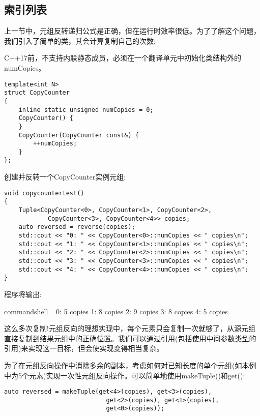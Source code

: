 \subsection{索引列表}

上一节中，元组反转递归公式是正确，但在运行时效率很低。为了了解这个问题，我们引入了简单的类，其会计算复制自己的次数:

\begin{tcolorbox}[colback=webgreen!5!white,colframe=webgreen!75!black]
\hspace*{0.75cm}C++17前，不支持内联静态成员，必须在一个翻译单元中初始化类结构外的numCopies。
\end{tcolorbox}

\begin{lstlisting}[style=styleCXX]
template<int N>
struct CopyCounter
{
	inline static unsigned numCopies = 0;
	CopyCounter() {
	}
	CopyCounter(CopyCounter const&) {
		++numCopies;
	}
};
\end{lstlisting}

创建并反转一个CopyCounter实例元组:

\begin{lstlisting}[style=styleCXX]
void copycountertest()
{
	Tuple<CopyCounter<0>, CopyCounter<1>, CopyCounter<2>,
			CopyCounter<3>, CopyCounter<4>> copies;
	auto reversed = reverse(copies);
	std::cout << "0: " << CopyCounter<0>::numCopies << " copies\n";
	std::cout << "1: " << CopyCounter<1>::numCopies << " copies\n";
	std::cout << "2: " << CopyCounter<2>::numCopies << " copies\n";
	std::cout << "3: " << CopyCounter<3>::numCopies << " copies\n";
	std::cout << "4: " << CopyCounter<4>::numCopies << " copies\n";
}
\end{lstlisting}

程序将输出:

\begin{tcblisting}{commandshell={}}
0: 5 copies
1: 8 copies
2: 9 copies
3: 8 copies
4: 5 copies
\end{tcblisting}

这么多次复制!元组反向的理想实现中，每个元素只会复制一次就够了，从源元组直接复制到结果元组中的正确位置。我们可以通过引用(包括使用中间参数类型的引用)来实现这一目标，但会使实现变得相当复杂。

为了在元组反向操作中消除多余的副本，考虑如何对已知长度的单个元组(如本例中为5个元素)实现一次性元组反向操作。可以简单地使用makeTuple()和get():

\begin{lstlisting}[style=styleCXX]
auto reversed = makeTuple(get<4>(copies), get<3>(copies),
							get<2>(copies), get<1>(copies),
							get<0>(copies));
\end{lstlisting}

